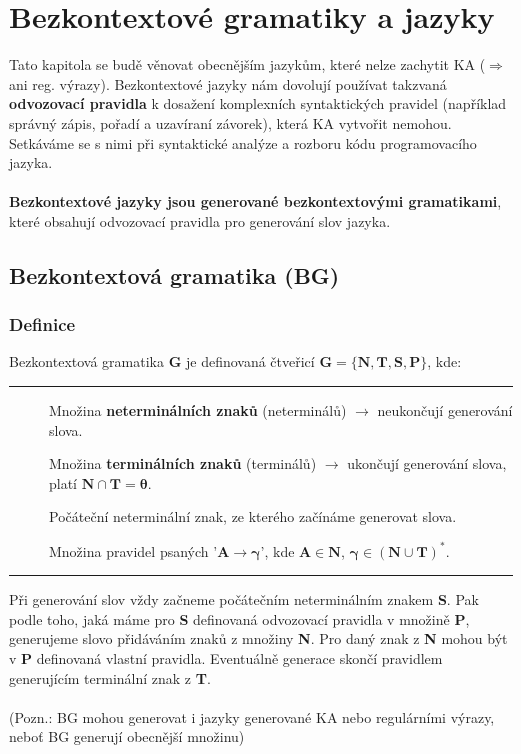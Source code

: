 \documentclass{report}
\begin{document}
\chapter*{Bezkontextové gramatiky a jazyky}
Tato kapitola se budě věnovat obecnějším jazykům, které nelze zachytit KA ($\Rightarrow$ ani reg. výrazy). Bezkontextové jazyky nám dovolují používat takzvaná \textbf{odvozovací pravidla} k dosažení komplexních syntaktických pravidel (například správný zápis, pořadí a uzavíraní závorek), která KA vytvořit nemohou. Setkáváme se s nimi při syntaktické analýze a rozboru kódu programovacího jazyka. \\ \\ \textbf{Bezkontextové jazyky jsou generované bezkontextovými gramatikami}, které obsahují odvozovací pravidla pro generování slov jazyka.
\section{Bezkontextová gramatika (BG)}
\subsection*{Definice}
Bezkontextová gramatika \textbf{G} je definovaná čtveřicí $\mathbf{G=\{N, T, S, P\}}$, kde:
\vspace{0.4cm}    
\hrule
\vspace{0.1cm}
\begin{description}
   \item[] Množina \textbf{neterminálních znaků} (neterminálů) $\rightarrow$ neukončují generování slova. 
   \item[] Množina \textbf{terminálních znaků} (terminálů) $\rightarrow$ ukončují generování slova, platí $\mathbf{N \cap T = \theta}$.
   \item[] Počáteční neterminální znak, ze kterého začínáme generovat slova.
   \item[] Množina pravidel psaných '$\mathbf{A \rightarrow \gamma}$', kde $\mathbf{A \in N}$, $\mathbf{\gamma \in (N \cup T)^*}$.
\end{description}
\vspace{0.1cm}    
\hrule
\vspace{0.4cm} 
Při generování slov vždy začneme počátečním neterminálním znakem \textbf{S}. Pak podle toho, jaká máme pro \textbf{S} definovaná odvozovací pravidla v množině \textbf{P}, generujeme slovo přidáváním znaků z množiny \textbf{N}. Pro daný znak z \textbf{N} mohou být v \textbf{P} definovaná vlastní pravidla. Eventuálně generace skončí pravidlem generujícím terminální znak z \textbf{T}.\\ \\
(Pozn.: BG mohou generovat i jazyky generované KA nebo regulárními výrazy, neboť BG generují obecnější množinu)
\end{document}
